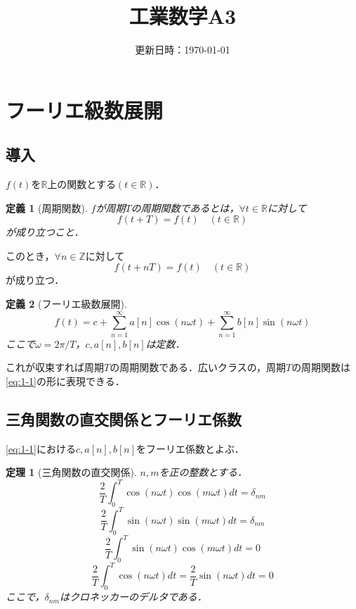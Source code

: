 \documentclass[dvipdfmx,a4j,10pt]{jsarticle}
\title{工業数学A3}
\author{}
\date{更新日時：\today}%
\theoremstyle{mystyle1}
\newtheorem{theorem}{定理}[section]
\theoremstyle{mystyle3}
\theoremstyle{mystyle4}
\theoremstyle{mystyle6}
\theoremstyle{mystyle2}
\newtheorem{dfn*}{定義}
\theoremstyle{mystyle5}
\newenvironment{thm}[1][]
{\begin{tcolorbox}[
    enhanced,
    boxrule=0pt,
    arc=0mm,
    frame hidden,
    borderline west={2pt}{-4pt}{red},
    breakable = true
    ]
    \begin{theorem}[#1]
}
{\end{theorem}\end{tcolorbox}}
\begin{document}
\maketitle
\tableofcontents%

\newpage

\section{フーリエ級数展開}

\subsection{導入}

$f(t)$を$\mathbb{R}$上の関数とする$(t\in\mathbb{R})$．

\begin{dfn*}[周期関数]
	$f$が周期$T$の周期関数であるとは，$\forall t\in\mathbb{R}$に対して
	\[
		f(t+T)=f(t)\quad(t\in\mathbb{R})
	\]
	が成り立つこと．
\end{dfn*}
このとき，$\forall n\in\mathbb{Z}$に対して
\[
	f(t+nT)=f(t)\quad(t\in\mathbb{R})
\]
が成り立つ．

\begin{dfn*}[フーリエ級数展開]
	\begin{equation}\label{eq:1-1}
		f(t)=c+\sum_{n=1}^\infty a[n]\cos(n\omega t)+\sum_{n=1}^\infty b[n]\sin(n\omega t)
	\end{equation}
	ここで$\omega=2\pi/T$，$c,a[n],b[n]$は定数．
\end{dfn*}

これが収束すれば周期$T$の周期関数である．広いクラスの，周期$T$の周期関数は\eqref{eq:1-1}の形に表現できる．

\subsection{三角関数の直交関係とフーリエ係数}

\eqref{eq:1-1}における$c,a[n],b[n]$をフーリエ係数とよぶ．

\begin{thm}[三角関数の直交関係]\label{thm:1-1}
	$n,m$を正の整数とする．
	\begin{equation}\label{eq:1-2}
		\frac{2}{T}\int_0^T\cos(n\omega t)\cos(m\omega t) dt=\delta_{nm}
	\end{equation}
	\begin{equation}\label{eq:1-3}
		\frac{2}{T}\int_0^T\sin(n\omega t)\sin(m\omega t) dt=\delta_{nm}
	\end{equation}
	\begin{equation}\label{eq:1-4}
		\frac{2}{T}\int_0^T\sin(n\omega t)\cos(m\omega t) dt=0
	\end{equation}
	\begin{equation}\label{eq:1-5}
		\frac{2}{T}\int_0^T\cos(n\omega t) dt=\frac{2}{T}\sin(n\omega t) dt=0
	\end{equation}
	ここで，$\delta_{nm}$はクロネッカーのデルタである．
\end{thm}
\end{document}
